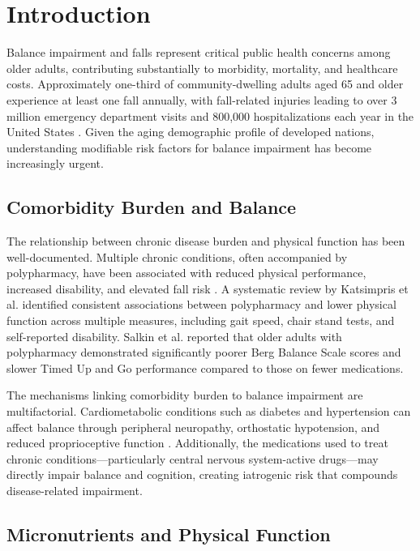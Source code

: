 \documentclass[11pt,a4paper]{article}
\begin{document}
\section{Introduction}

Balance impairment and falls represent critical public health concerns among older adults, contributing substantially to morbidity, mortality, and healthcare costs. Approximately one-third of community-dwelling adults aged 65 and older experience at least one fall annually, with fall-related injuries leading to over 3 million emergency department visits and 800,000 hospitalizations each year in the United States \cite{talkowski2008_balance_gait_walking}. Given the aging demographic profile of developed nations, understanding modifiable risk factors for balance impairment has become increasingly urgent.

\subsection{Comorbidity Burden and Balance}

The relationship between chronic disease burden and physical function has been well-documented. Multiple chronic conditions, often accompanied by polypharmacy, have been associated with reduced physical performance, increased disability, and elevated fall risk \cite{katsimpris2019_polypharmacy_function_review}. A systematic review by Katsimpris et al. \cite{katsimpris2019_polypharmacy_function_review} identified consistent associations between polypharmacy and lower physical function across multiple measures, including gait speed, chair stand tests, and self-reported disability. Salkin et al. \cite{salkin2025_polypharmacy_balance} reported that older adults with polypharmacy demonstrated significantly poorer Berg Balance Scale scores and slower Timed Up and Go performance compared to those on fewer medications.

The mechanisms linking comorbidity burden to balance impairment are multifactorial. Cardiometabolic conditions such as diabetes and hypertension can affect balance through peripheral neuropathy, orthostatic hypotension, and reduced proprioceptive function \cite{romandemettelinge2013_diabetes_falls_medications}. Additionally, the medications used to treat chronic conditions—particularly central nervous system-active drugs—may directly impair balance and cognition, creating iatrogenic risk that compounds disease-related impairment.

\subsection{Micronutrients and Physical Function}
\end{document}
